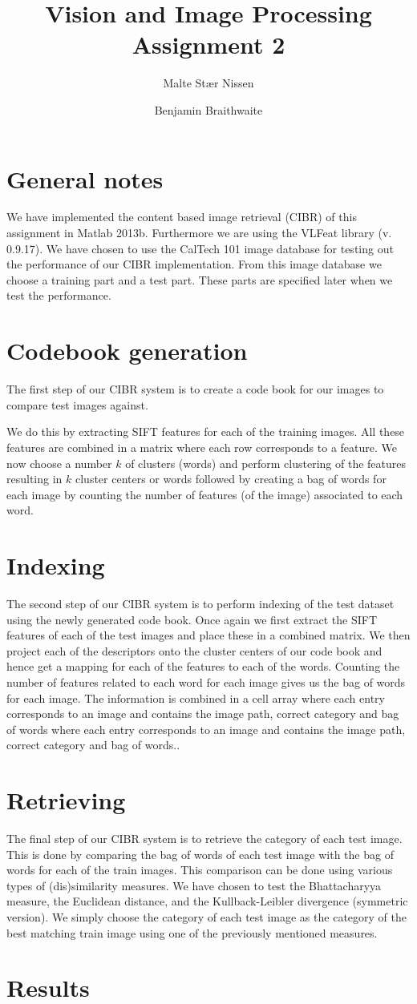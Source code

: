 \documentclass[11pt,a4paper]{article}
\title{Vision and Image Processing\\Assignment 2}
\author{Malte Stær Nissen \and Benjamin Braithwaite}
\begin{document}
\maketitle

\section{General notes}
We have implemented the content based image retrieval (CIBR) of this assignment
in Matlab 2013b. Furthermore we are using the VLFeat library (v. 0.9.17). We
have chosen to use the CalTech 101 image database for testing out the
performance of our CIBR implementation. From this image database we choose a
training part and a test part. These parts are specified later when we test the
performance.

\section{Codebook generation}
The first step of our CIBR system is to create a code book for our images to
compare test images against.

We do this by extracting SIFT features for each of the training images. All
these features are combined in a matrix where each row corresponds to a
feature. We now choose a number $k$ of clusters (words) and perform clustering
of the features resulting in $k$ cluster centers or words followed by creating
a bag of words for each image by counting the number of features (of the image)
associated to each word.

\section{Indexing}
The second step of our CIBR system is to perform indexing of the test dataset
using the newly generated code book. Once again we first extract the SIFT
features of each of the test images and place these in a combined matrix. We
then project each of the descriptors onto the cluster centers of our code book
and hence get a mapping for each of the features to each of the words. Counting
the number of features related to each word for each image gives us the bag of
words for each image. The information is combined in a cell array where each
entry corresponds to an image and contains the image path, correct category and
bag of words where each entry corresponds to an image and contains the image
path, correct category and bag of words..

\section{Retrieving}
The final step of our CIBR system is to retrieve the category of each test
image. This is done by comparing the bag of words of each test image with the
bag of words for each of the train images. This comparison can be done using
various types of (dis)similarity measures. We have chosen to test the
Bhattacharyya measure, the Euclidean distance, and the
Kullback-Leibler divergence (symmetric version). We simply choose the category
of each test image as the category of the best matching train image using one of
the previously mentioned measures.

\section{Results}
\end{document}
